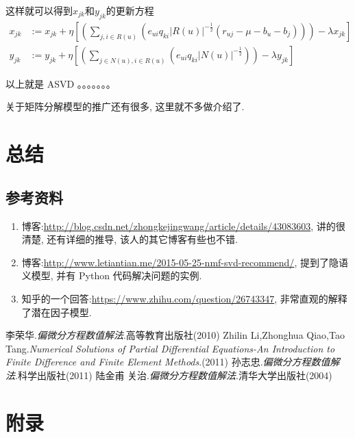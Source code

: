 \documentclass[a4paper,UTF8]{ctexart}
\theoremstyle{plain} \newtheorem{theorem}{定理}[section]
\theoremstyle{plain} \newtheorem{definition}{定义}[section]
\theoremstyle{plain} \newtheorem{lemma}{引理}[section]
\theoremstyle{plain} \newtheorem{proposition}{命题}[section]
\theoremstyle{plain} \newtheorem{example}{例}[section]
\theoremstyle{plain} \newtheorem{remark}{注}[section]
\theoremstyle{plain} \newtheorem{corollary}{推论}[section]
\begin{document}
这样就可以得到$x_{jk}$和$y_{jk}$的更新方程
\begin{align*}
x_{jk} & := x_{jk} + \eta \left[ \left( \sum_{j,i \in R(u)} \left( e_{ui} q_{ki} |R(u)|^{-\frac{1}{2}} (r_{uj} - \mu - b_{u} - b_{j}) \right) \right) - \lambda x_{jk} \right] \\ 
y_{jk} & := y_{jk} + \eta \left[ \left( \sum_{j \in N(u), i \in R(u)} \left( e_{ui} q_{ki} |N(u)|^{-\frac{1}{2}} \right) \right) - \lambda y_{jk} \right]
\end{align*}

以上就是 ASVD 。。。。。。。

关于矩阵分解模型的推广还有很多, 这里就不多做介绍了.










\section{总结}
\subsection{参考资料}
\begin{enumerate}[(1)]
\item 博客:\url{http://blog.csdn.net/zhongkejingwang/article/details/43083603}, 讲的很清楚, 还有详细的推导, 该人的其它博客有些也不错.

\item 博客:\url{http://www.letiantian.me/2015-05-25-nmf-svd-recommend/}, 提到了隐语义模型, 并有 Python 代码解决问题的实例.

\item 知乎的一个回答:\url{https://www.zhihu.com/question/26743347}, 非常直观的解释了潜在因子模型.


\end{enumerate}








\begin{thebibliography}{4}
   李荣华.\emph{偏微分方程数值解法}.高等教育出版社(2010) 
   Zhilin Li,Zhonghua Qiao,Tao Tang.\emph{Numerical Solutions of Partial Differential Equations-An Introduction to Finite Difference and Finite Element Methods}.(2011)
   孙志忠.\emph{偏微分方程数值解法}.科学出版社(2011)
   陆金甫 关治.\emph{偏微分方程数值解法}.清华大学出版社(2004)
  
\end{thebibliography}

\newpage

\section*{附录}
\end{document}
